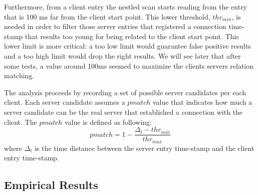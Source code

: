 Furthermore, from a client
entry the nestled scan starts reading from the entry that is 100 ms far
from the client start point. This lower threshold, $thr_{min}$, is needed in order to
 filter those server entries that registered a connection time-stamp
that results too young for being related to the client start point. This
lower limit is more critical: a too low limit would guarantee false
positive results and a too high limit would drop the right results.
We will see later that after some tests, a value around 100ms seemed to maximize 
the clients servers relation matching. %

The analysis proceeds by recording a set of possible server candidates 
 per each client. Each server candidate assumes a $pmatch$ value that
indicates how much a server candidate can be the real server that
established a connection with the client. The $pmatch$ value is defined
as following:
\begin{equation}
pmatch = 1 - \frac{\Delta_t - thr_{min}}{thr_{max}}
\end{equation}
where $\Delta_t$ is the time distance between the server entry time-stamp and
the client entry time-stamp.
\subsection{Empirical Results}
